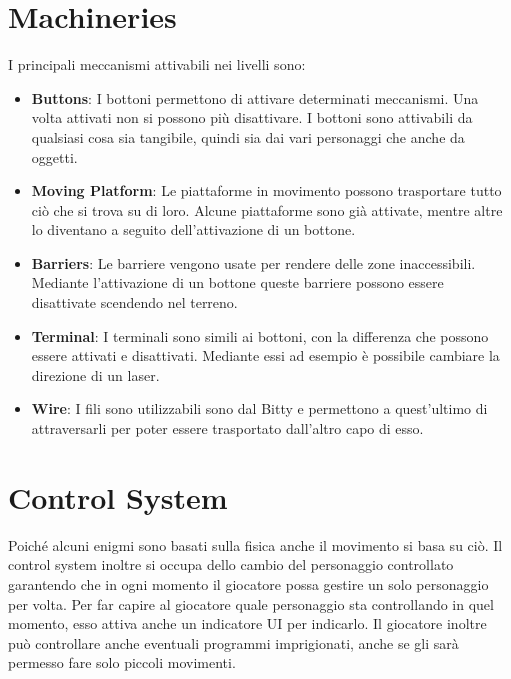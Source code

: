 \documentclass[12pt, a4paper]{report}
\begin{document}
\section*{Machineries}
I principali meccanismi attivabili nei livelli sono:
\begin{itemize}
	\item \textbf{Buttons}: I bottoni permettono di attivare determinati meccanismi. Una volta attivati non si possono più disattivare. I bottoni sono attivabili da qualsiasi cosa sia tangibile, quindi sia dai vari personaggi che anche da oggetti.
	\item \textbf{Moving Platform}: Le piattaforme in movimento possono trasportare tutto ciò che si trova su di loro. Alcune piattaforme sono già attivate, mentre altre lo diventano a seguito dell'attivazione di un bottone.
	\item \textbf{Barriers}: Le barriere vengono usate per rendere delle zone inaccessibili. Mediante l'attivazione di un bottone queste barriere possono essere disattivate scendendo nel terreno.
	\item \textbf{Terminal}: I terminali sono simili ai bottoni, con la differenza che possono essere attivati e disattivati. Mediante essi ad esempio è possibile cambiare la direzione di un laser.
	\item \textbf{Wire}: I fili sono utilizzabili sono dal Bitty e permettono a quest'ultimo di attraversarli per poter essere trasportato dall'altro capo di esso.
\end{itemize}

\section*{Control System}
Poiché alcuni enigmi sono basati sulla fisica anche il movimento si basa su ciò. Il control system inoltre si occupa dello cambio del personaggio controllato garantendo che in ogni momento il giocatore possa gestire un solo personaggio per volta. Per far capire al giocatore quale personaggio sta controllando in quel momento, esso attiva anche un indicatore UI per indicarlo. Il giocatore inoltre può controllare anche eventuali programmi imprigionati, anche se gli sarà permesso fare solo piccoli movimenti.
\end{document}
